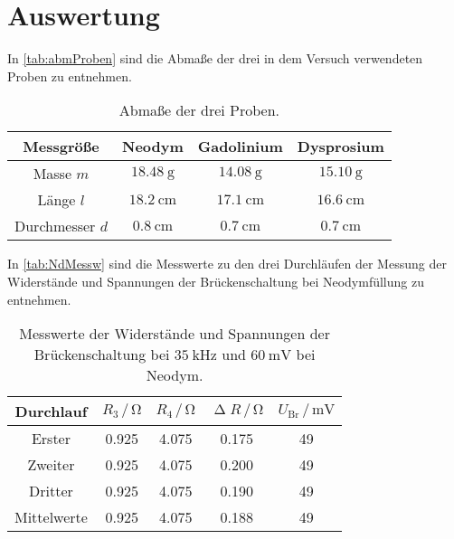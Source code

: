 \section{Auswertung}
\label{sec:Auswertung}

In \autoref{tab:abmProben} sind die Abmaße der drei in dem Versuch verwendeten Proben zu entnehmen.
\begin{table}[H]
  \centering
  \caption{Abmaße der drei Proben.}
  \label{tab:abmProben}
  \begin{tabular}{c c c c}
    \toprule
    Messgröße & Neodym & Gadolinium & Dysprosium \\
    \midrule
    Masse $m$ & $\SI{18.48}{\gram}$ & $\SI{14.08}{\gram}$ & $\SI{15.10}{\gram}$ \\
    Länge $l$ & $\SI{18.2}{\centi\meter}$ & $\SI{17.1}{\centi\meter}$ & $\SI{16.6}{\centi\meter}$ \\ %
    Durchmesser $d$ & $\SI{0.8}{\centi\meter}$ & $\SI{0.7}{\centi\meter}$ & $\SI{0.7}{\centi\meter}$ \\
    \bottomrule
  \end{tabular}
\end{table}

In \autoref{tab:NdMessw} sind die Messwerte zu den drei Durchläufen der Messung der Widerstände und Spannungen der Brückenschaltung bei Neodymfüllung zu entnehmen.
\begin{table}[H]
  \centering
  \caption{Messwerte der Widerstände und Spannungen der Brückenschaltung bei $\SI{35}{\kilo\hertz}$ und $\SI{60}{\milli\volt}$ bei Neodym.}
  \label{tab:NdMessw}
  \begin{tabular}{c| c c c c}
    \toprule
    Durchlauf & $R_3 \,/\, \si{\ohm}$ & $R_4 \,/\, \si{\ohm}$ & $\upDelta R \,/\, \si{\ohm}$ & $U_{\text{Br}} \,/\, \si{\milli\volt}$ \\%
    \midrule
    Erster & 0.925 & 4.075 & 0.175 & 49 \\
    Zweiter & 0.925 & 4.075 & 0.200 & 49 \\
    Dritter & 0.925 & 4.075 & 0.190 & 49 \\
    Mittelwerte & 0.925 & 4.075 & 0.188 & 49\\
    \bottomrule
  \end{tabular}
\end{table}


